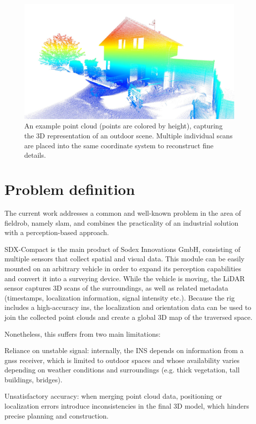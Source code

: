 \begin{figure}[H]
    \centering
    \includegraphics[width=0.7\linewidth]{images/pointcloud_example.jpeg}
    \caption[Point Cloud Example]{An example point cloud (points are colored by height), capturing the 3D representation of an outdoor scene. Multiple individual scans are placed into the same coordinate system to reconstruct fine details.}
    \label{fig:pcd-example}
\end{figure}

\section{Problem definition}

The current work addresses a common and well-known problem in the area of \gls{fieldrob}, namely \acrfull{slam}, and combines the practicality of an industrial solution with a perception-based approach.

SDX-Compact  is the main product of Sodex Innovations GmbH, consisting of multiple sensors that collect spatial and visual data. This module can be easily mounted on an arbitrary vehicle in order to expand its perception capabilities and convert it into a \gls{surveying} device. While the vehicle is moving, the LiDAR sensor captures 3D scans of the surroundings, as well as related metadata (timestamps, localization information, signal intensity etc.). Because the rig includes a high-accuracy \acrfull{ins}, the localization and orientation data can be used to join the collected point clouds and create a global 3D map of the traversed space.

Nonetheless, this suffers from two main limitations:

\begin{compactitem}
    \item Reliance on unstable signal: internally, the INS depends on information from a \acrfull{gnss} receiver, which is limited to outdoor spaces and whose availability varies depending on weather conditions and surroundings (e.g. thick vegetation, tall buildings, bridges).
    \item Unsatisfactory accuracy: when merging point cloud data, positioning or localization errors introduce inconsistencies in the final 3D model, which hinders precise planning and construction.
\end{compactitem}


